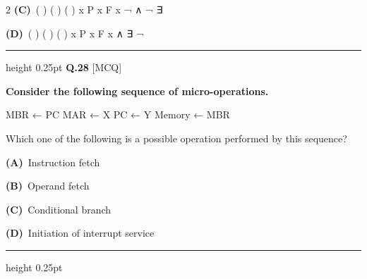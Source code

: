 \documentclass[a4paper,10pt,twoside]{article}
\begin{document}
\begin{multicols}{2}
\textbf{(C)}~( ) \newline ( ) \newline ( \newline ) \newline x \newline P \newline x \newline F \newline x \newline ¬ \newline ∧ \newline ¬ \newline ∃\par\vspace{2pt}\noindent
\textbf{(D)}~( ) \newline ( ) \newline ( \newline ) \newline x \newline P \newline x \newline F \newline x \newline ∧ \newline ∃ \newline ¬
\par\vspace{6pt}\hrule height 0.25pt\vspace{6pt}
\noindent\textbf{Q.28} \hfill {\footnotesize\textsf{[MCQ]}}
\par\vspace{2pt}
{\bfseries Consider the following sequence of micro-operations.
\par\smallskip
MBR ← PC
MAR ← X
PC ← Y
Memory ← MBR
\par\smallskip
Which one of the following is a possible operation performed by this sequence? \par}
\par\vspace{2pt}\noindent
\textbf{(A)}~Instruction fetch\par\vspace{2pt}\noindent
\textbf{(B)}~Operand fetch\par\vspace{2pt}\noindent
\textbf{(C)}~Conditional branch\par\vspace{2pt}\noindent
\textbf{(D)}~Initiation of interrupt service
\par\vspace{6pt}\hrule height 0.25pt\vspace{6pt}

\end{multicols}
\end{document}
